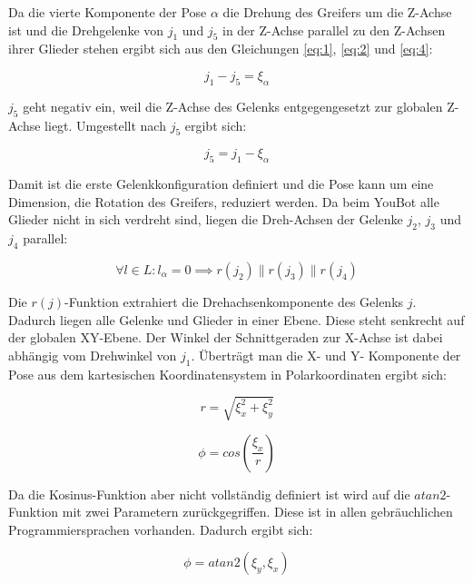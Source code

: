Da die vierte Komponente der Pose $\alpha$ die Drehung des Greifers um die Z-Achse ist und die Drehgelenke von $j_1$ und $j_5$ in der Z-Achse parallel zu den Z-Achsen ihrer Glieder stehen ergibt sich aus den Gleichungen \ref{eq:1}, \ref{eq:2} und \ref{eq:4}:

\begin{equation}
j_1 - j_5 = \xi_{\alpha}
\end{equation}

$j_5$ geht negativ ein, weil die Z-Achse des Gelenks entgegengesetzt zur globalen Z-Achse liegt. Umgestellt nach $j_5$ ergibt sich:

\begin{equation}
j_5 = j_1 - \xi_{\alpha}
\end{equation}

Damit ist die erste Gelenkkonfiguration definiert und die Pose kann um eine Dimension, die Rotation des Greifers, reduziert werden. Da beim YouBot alle Glieder nicht in sich verdreht sind, liegen die Dreh-Achsen der Gelenke $j_2$, $j_3$ und $j_4$ parallel:

\begin{equation}
	\forall l  \in L: l_{\alpha} = 0 \implies r(j_{2}) \parallel r(j_{3}) \parallel r(j_{4}) 
\end{equation}

Die $r(j)$-Funktion extrahiert die Drehachsenkomponente des Gelenks $j$. Dadurch liegen alle Gelenke und Glieder in einer Ebene. Diese steht senkrecht auf der globalen XY-Ebene. Der Winkel der Schnittgeraden zur X-Achse ist dabei abhängig vom Drehwinkel von $j_1$. Überträgt man die X- und Y- Komponente der Pose aus dem kartesischen Koordinatensystem in Polarkoordinaten ergibt sich:

\begin{equation}
r = \sqrt{\xi_x^2 + \xi_y^2}
\label{eq:5}
\end{equation}

\begin{equation}
\phi = cos(\dfrac{\xi_x}{r})
\label{eq:6}
\end{equation}

Da die Kosinus-Funktion aber nicht vollständig definiert ist wird auf die $atan2$-Funktion mit zwei Parametern zurückgegriffen. Diese ist in allen gebräuchlichen Programmiersprachen vorhanden. Dadurch ergibt sich:

\begin{equation}
\phi = atan2(\xi_y,\xi_x)
\label{eq:7}
\end{equation}

